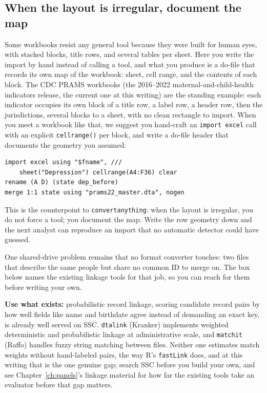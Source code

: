 \documentclass[
    a4paper,
    fontsize=10pt,
    twoside=true,
    numbers=noenddot,
]{kaobook}
\begin{document}
\subsection{When the layout is irregular, document the map}\label{sec:ch04-irregular}
Some workbooks resist any general tool because they were built for human eyes, with stacked blocks, title rows, and several tables per sheet. Here you write the import by hand instead of calling a tool, and what you produce is a do-file that records its own map of the workbook: sheet, cell range, and the contents of each block. The CDC PRAMS workbooks (the 2016--2022 maternal-and-child-health indicators release, the current one at this writing) are the standing example: each indicator occupies its own block of a title row, a label row, a header row, then the jurisdictions, several blocks to a sheet, with no clean rectangle to import. When you meet a workbook like that, we suggest you hand-craft an \texttt{import excel} call with an explicit \texttt{cellrange()} per block, and write a do-file header that documents the geometry you assumed:
\par
{\footnotesize
\begin{verbatim}
import excel using "$fname", ///
    sheet("Depression") cellrange(A4:F36) clear
rename (A D) (state dep_before)
merge 1:1 state using "prams22_master.dta", nogen
\end{verbatim}
}
This is the counterpoint to \texttt{convertanything}: when the layout is irregular, you do not force a tool; you document the map. Write the row geometry down and the next analyst can reproduce an import that no automatic detector could have guessed.

One shared-drive problem remains that no format converter touches: two files that describe the same people but share no common ID to merge on. The box below names the existing linkage tools for that job, so you can reach for them before writing your own.

\begin{kaobox}[frametitle=Existing tools: probabilistic linkage with \texttt{dtalink} and \texttt{matchit}]
\textbf{Use what exists:} probabilistic record linkage, scoring candidate record pairs by how well fields like name and birthdate agree instead of demanding an exact key, is already well served on SSC. \texttt{dtalink} (Kranker) implements weighted deterministic and probabilistic linkage at administrative scale, and \texttt{matchit} (Raffo) handles fuzzy string matching between files. Neither one estimates match weights without hand-labeled pairs, the way R's \texttt{fastLink} does, and at this writing that is the one genuine gap; search SSC before you build your own, and see Chapter~\ref{ch:panels}'s linkage material for how far the existing tools take an evaluator before that gap matters.
\end{kaobox}
\end{document}
